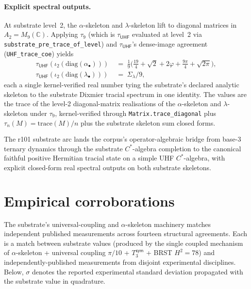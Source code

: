 \documentclass[11pt,a4paper]{amsart}
\theoremstyle{plain}
\theoremstyle{definition}
\begin{document}
\paragraph{Explicit spectral outputs.} At substrate level~2, the $\alpha$-skeleton and $\lambda$-skeleton lift to diagonal matrices in $A_2 = M_9(\mathbb{C})$. Applying $\tau_9$ (which is $\tau_{\textsf{UHF}}$ evaluated at level~2 via \texttt{substrate\_pre\_trace\_of\_level}) and $\tau_{\textsf{UHF}}$'s dense-image agreement (\texttt{UHF\_trace\_coe}) yields
\begin{align*}
\tau_{\textsf{UHF}}(\iota_2(\mathrm{diag}(\alpha_\bullet))) &\;=\; \tfrac{1}{9}\bigl(\tfrac{19}{4} + \sqrt{2} + 2\varphi + \tfrac{9\pi}{4} + \sqrt{2\pi}\bigr), \\[2pt]
\tau_{\textsf{UHF}}(\iota_2(\mathrm{diag}(\lambda_\bullet))) &\;=\; \Sigma_\lambda / 9,
\end{align*}
each a single kernel-verified real number tying the substrate's declared analytic skeleton to the substrate Dixmier tracial spectrum in one identity. The values are the trace of the level-2 diagonal-matrix realisations of the $\alpha$-skeleton and $\lambda$-skeleton under $\tau_9$, kernel-verified through \texttt{Matrix.trace\_diagonal} plus $\tau_n(M) = \mathrm{trace}(M)/n$ plus the substrate skeleton sum closed forms.

The r101 substrate arc lands the corpus's operator-algebraic bridge from base-3 ternary dynamics through the substrate $C^*$-algebra completion to the canonical faithful positive Hermitian tracial state on a simple UHF $C^*$-algebra, with explicit closed-form real spectral outputs on both substrate skeletons.

\section{Empirical corroborations}\label{sec:empirical}

The substrate's universal-coupling and $\alpha$-skeleton machinery matches independent published measurements across fourteen structural agreements. Each is a match between substrate values (produced by the single coupled mechanism of $\alpha$-skeleton + universal coupling $\pi/10$ + $T_3^{\textsf{sym}}$ + BRST $H^2 = 78$) and independently-published measurements from disjoint experimental disciplines. Below, $\sigma$ denotes the reported experimental standard deviation propagated with the substrate value in quadrature.
\end{document}
